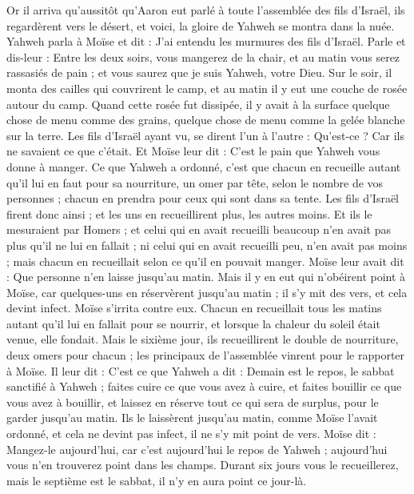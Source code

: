 \begin{multicols}{2}
Or il arriva qu'aussitôt qu'Aaron eut parlé à toute l'assemblée des fils d'Israël, ils regardèrent vers le désert, et voici, la gloire de Yahweh se montra dans la nuée.
Yahweh parla à Moïse et dit :
J'ai entendu les murmures des fils d'Israël. Parle et dis-leur : Entre les deux soirs, vous mangerez de la chair, et au matin vous serez rassasiés de pain ; et vous saurez que je suis Yahweh, votre Dieu.
Sur le soir, il monta des cailles qui couvrirent le camp, et au matin il y eut une couche de rosée autour du camp.
Quand cette rosée fut dissipée, il y avait à la surface quelque chose de menu comme des grains, quelque chose de menu comme la gelée blanche sur la terre.
Les fils d'Israël ayant vu, se dirent l'un à l'autre : Qu'est-ce ? Car ils ne savaient ce que c'était. Et Moïse leur dit : C'est le pain que Yahweh vous donne à manger.
Ce que Yahweh a ordonné, c'est que chacun en recueille autant qu'il lui en faut pour sa nourriture, un omer par tête, selon le nombre de vos personnes ; chacun en prendra pour ceux qui sont dans sa tente.
Les fils d'Israël firent donc ainsi ; et les uns en recueillirent plus, les autres moins.
Et ils le mesuraient par Homers ; et celui qui en avait recueilli beaucoup n'en avait pas plus qu'il ne lui en fallait ; ni celui qui en avait recueilli peu, n'en avait pas moins ; mais chacun en recueillait selon ce qu'il en pouvait manger.
Moïse leur avait dit : Que personne n'en laisse jusqu’au matin.
Mais il y en eut qui n'obéirent point à Moïse, car quelques-uns en réservèrent jusqu'au matin ; il s'y mit des vers, et cela devint infect. Moïse s’irrita contre eux.
Chacun en recueillait tous les matins autant qu'il lui en fallait pour se nourrir, et lorsque la chaleur du soleil était venue, elle fondait.
Mais le sixième jour, ils recueillirent le double de nourriture, deux omers pour chacun ; les principaux de l'assemblée vinrent pour le rapporter à Moïse.
Il leur dit : C'est ce que Yahweh a dit : Demain est le repos, le sabbat sanctifié à Yahweh ; faites cuire ce que vous avez à cuire, et faites bouillir ce que vous avez à bouillir, et laissez en réserve tout ce qui sera de surplus, pour le garder jusqu'au matin.
Ils le laissèrent jusqu’au matin, comme Moïse l'avait ordonné, et cela ne devint pas infect, il ne s’y mit point de vers.
Moïse dit : Mangez-le aujourd'hui, car c'est aujourd'hui le repos de Yahweh ; aujourd'hui vous n'en trouverez point dans les champs.
Durant six jours vous le recueillerez, mais le septième est le sabbat, il n'y en aura point ce jour-là.

\end{multicols}
